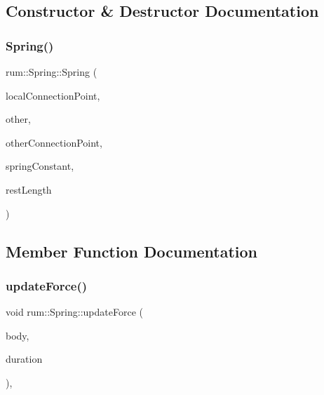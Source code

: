 \subsection{Constructor \& Destructor Documentation}
\mbox{\label{classrum_1_1_spring_a2277a63f256766c6f92a6a7e1d505273}} 
\subsubsection{\texorpdfstring{Spring()}{Spring()}}
{\footnotesize\ttfamily rum\+::\+Spring\+::\+Spring (\begin{DoxyParamCaption}\item[{const glm\+::vec3 \&}]{local\+Connection\+Point,  }\item[{\mbox{\hyperlink{classrum_1_1_rigid_body}{Rigid\+Body}} $\ast$}]{other,  }\item[{const glm\+::vec3 \&}]{other\+Connection\+Point,  }\item[{\mbox{\hyperlink{namespacerum_a7e8cca23573d5eaead0f138cbaa4862c}{real}}}]{spring\+Constant,  }\item[{\mbox{\hyperlink{namespacerum_a7e8cca23573d5eaead0f138cbaa4862c}{real}}}]{rest\+Length }\end{DoxyParamCaption})}



\subsection{Member Function Documentation}
\mbox{\label{classrum_1_1_spring_a31f5e48beb95ebc394ff2cb1dd813708}} 
\subsubsection{\texorpdfstring{update\+Force()}{updateForce()}}
{\footnotesize\ttfamily void rum\+::\+Spring\+::update\+Force (\begin{DoxyParamCaption}\item[{\mbox{\hyperlink{classrum_1_1_rigid_body}{Rigid\+Body}} $\ast$}]{body,  }\item[{\mbox{\hyperlink{namespacerum_a7e8cca23573d5eaead0f138cbaa4862c}{real}}}]{duration }\end{DoxyParamCaption})\hspace{0.3cm}{\ttfamily [override]}, {\ttfamily [virtual]}}



